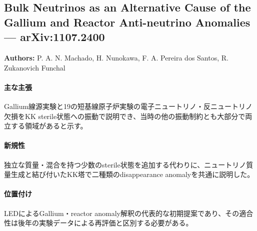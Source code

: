 \subsection{Bulk Neutrinos as an Alternative Cause of the Gallium and Reactor Anti-neutrino Anomalies --- arXiv:1107.2400}

\textbf{Authors:} P. A. N. Machado, H. Nunokawa, F. A. Pereira dos Santos, R. Zukanovich Funchal

\paragraph{主な主張}
Gallium線源実験と19の短基線原子炉実験の電子ニュートリノ・反ニュートリノ欠損をKK sterile状態への振動で説明でき、当時の他の振動制約とも大部分で両立する領域があると示す\cite{Machado:2012LEDAnomalies}。

\paragraph{新規性}
独立な質量・混合を持つ少数のsterile状態を追加する代わりに、ニュートリノ質量生成と結び付いたKK塔で二種類のdisappearance anomalyを共通に説明した。

\paragraph{位置付け}
LEDによるGallium・reactor anomaly解釈の代表的な初期提案であり、その適合性は後年の実験データによる再評価と区別する必要がある。
